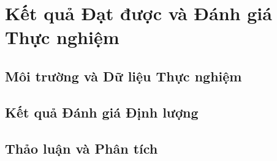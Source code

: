 \chapter{Kết quả Đạt được và Đánh giá Thực nghiệm}
\label{chap:results}

\section{Môi trường và Dữ liệu Thực nghiệm}
\label{sec:experimental-setup}

\section{Kết quả Đánh giá Định lượng}
\label{sec:quantitative-results}

\section{Thảo luận và Phân tích}
\label{sec:discussion}
